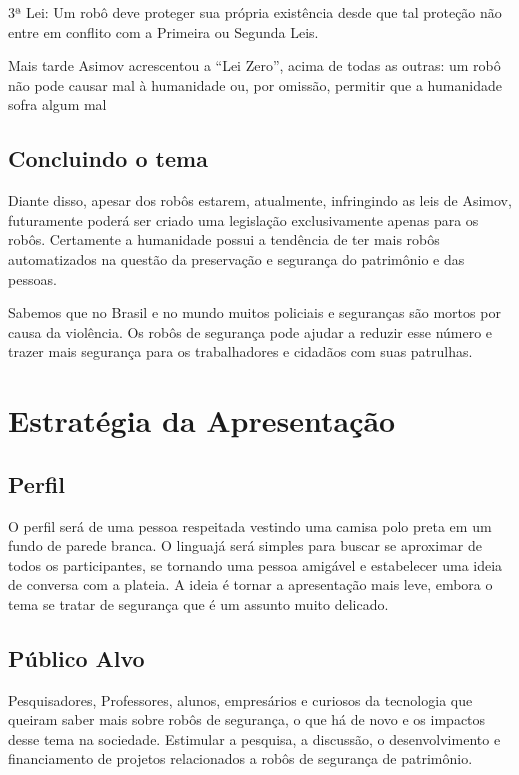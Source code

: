 \documentclass[12pt,a4paper]{article}
\begin{document}
    3ª Lei: Um robô deve proteger sua própria existência desde que tal proteção não entre em conflito com a Primeira ou Segunda Leis.

    Mais tarde Asimov acrescentou a “Lei Zero”, acima de todas as outras: um robô não pode causar mal à humanidade ou, por omissão, permitir que a humanidade sofra algum mal

    \subsection{Concluindo o tema}
    Diante disso, apesar dos robôs estarem, atualmente, infringindo as leis de Asimov, futuramente poderá ser criado uma legislação exclusivamente apenas para os robôs. Certamente a humanidade possui a tendência de ter mais robôs automatizados na questão da preservação e segurança do patrimônio e das pessoas.

    Sabemos que no Brasil e no mundo muitos policiais e seguranças são mortos por causa da violência. Os robôs de segurança pode ajudar a reduzir esse número e trazer mais segurança para os trabalhadores e cidadãos com suas patrulhas.  

    \section{Estratégia da Apresentação}

    \subsection{Perfil}
    O perfil será de uma pessoa respeitada vestindo uma camisa polo preta em um fundo de parede branca. O linguajá será simples para buscar se aproximar de todos os participantes, se tornando uma pessoa amigável e estabelecer uma ideia de conversa com a plateia. A ideia é tornar a apresentação mais leve, embora o tema se tratar de segurança que é um assunto muito delicado.

    \subsection{Público Alvo}
    Pesquisadores, Professores, alunos, empresários e curiosos da tecnologia que queiram saber mais sobre robôs de segurança, o que há de novo e os impactos desse tema na sociedade. Estimular a pesquisa, a discussão, o desenvolvimento e financiamento de projetos relacionados a robôs de segurança de patrimônio.
\end{document}
